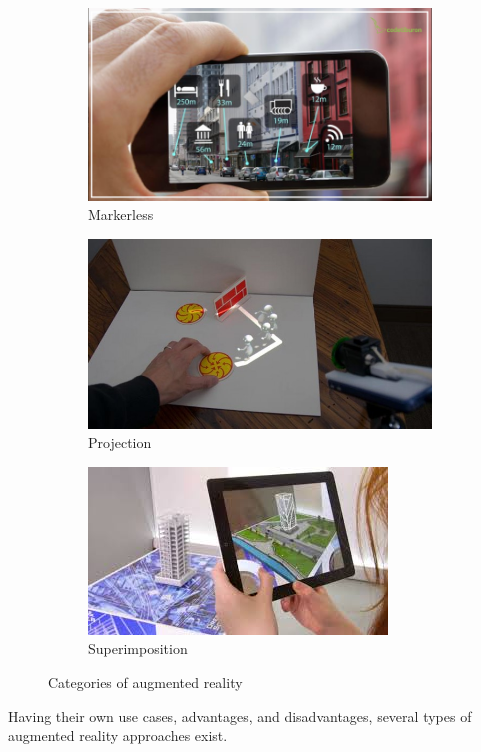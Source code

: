 \documentclass[12 pct]{report}
\begin{document}
\begin{figure}[h!]
\begin{subfigure}[b]{0.36\linewidth}
  \end{subfigure}
  \begin{subfigure}[b]{0.4\linewidth}
    \includegraphics[width=\linewidth]{marker-less}
    \caption{Markerless \cite{comport2006real}}
  \end{subfigure}
  \begin{subfigure}[b]{0.4\linewidth}
    \includegraphics[width=\linewidth]{projection-based}
    \caption{Projection \cite{mine2012projection}}
  \end{subfigure}
  \begin{subfigure}[b]{0.4\linewidth}
    \includegraphics[width=\linewidth]{super-imposition}
    \caption{Superimposition \cite{milgram1995augmented}}
  \end{subfigure}
  \caption{Categories of augmented reality}
  \label{fig:coffee3}
\end{figure}
Having their own use cases, advantages, and disadvantages, several types of augmented reality approaches exist.
\end{document}

